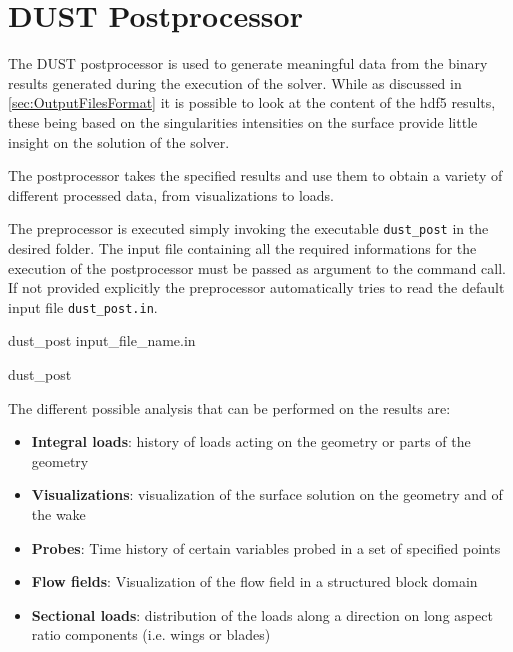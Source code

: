 \chapter{DUST Postprocessor}
\label{ch:Post}

The DUST postprocessor is used to generate meaningful data from the binary 
results generated during the execution of the solver. While as discussed in 
\ref{sec:OutputFilesFormat} it is possible to look at the content of the hdf5 
results, these being based on the singularities intensities on the surface provide 
little insight on the solution of the solver. 

The postprocessor takes the specified results and use them to obtain a variety of 
different processed data, from visualizations to loads. 

The preprocessor is executed simply invoking the executable \texttt{dust\_post} 
in the desired folder. The input file containing all the required informations 
for the execution of the postprocessor must be passed as argument to the command call. 
If not provided explicitly the preprocessor automatically tries to read the default 
input file \texttt{dust\_post.in}.
\begin{command}[caption={Postprocessor command looking for input file 
  \texttt{input\_file\_name.in}}]
  dust_post input_file_name.in
\end{command}

\begin{command}[caption={Postprocessor command looking for 
default input file \texttt{dust\_post.in}}, label={command:dust_post_default}]
  dust_post
\end{command}

The different possible analysis that can be performed on the results are:
\begin{itemize}
\item \textbf{Integral loads}: history of loads acting on the geometry or parts 
      of the geometry
\item \textbf{Visualizations}: visualization of the surface solution 
      on the geometry and of the wake
\item \textbf{Probes}: Time history of certain variables probed in a 
      set of specified points
\item \textbf{Flow fields}: Visualization of the flow field in a structured 
      block domain
\item \textbf{Sectional loads}: distribution of the loads along a direction 
      on long aspect ratio components (i.e. wings or blades)
\end{itemize}


